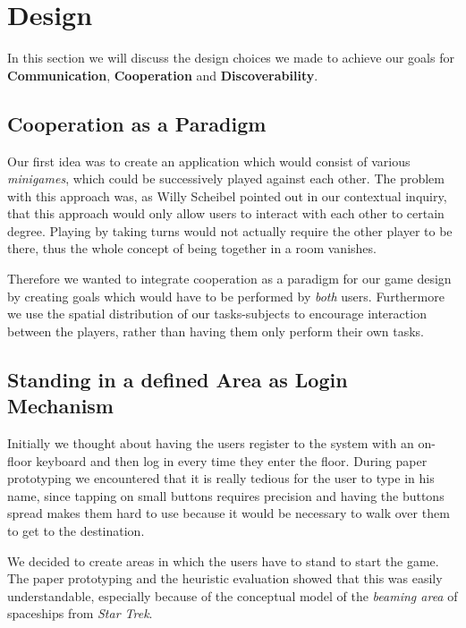 \documentclass{sigchi}
\begin{document}
\section{Design}
\vspace{1mm}
In this section we will discuss the design choices we made to achieve our goals for \textbf{Communication}, \textbf{Cooperation} and \textbf{Discoverability}.

\subsection{Cooperation as a Paradigm}
\vspace{1mm}
Our first idea was to create an application which would consist of various \textit{minigames}, which could be successively played against each other. The problem with this approach was, as Willy Scheibel pointed out in our contextual inquiry, that this approach would only allow users to interact with each other to certain degree. Playing by taking turns would not actually require the other player to be there, thus the whole concept of being together in a room vanishes. 

Therefore we wanted to integrate cooperation as a paradigm for our game design by creating goals which would have to be performed by \textit{both} users. Furthermore we use the spatial distribution of our tasks-subjects to encourage interaction between the players, rather than having them only perform their own tasks. 
 
\subsection{Standing in a defined Area as Login Mechanism}
\vspace{1mm}
Initially we thought about having the users register to the system with an on-floor keyboard and then log in every time they enter the floor. During paper prototyping we encountered that it is really tedious for the user to type in his name, since tapping on small buttons requires precision and having the buttons spread makes them hard to use because it would be necessary to walk over them to get to the destination. 

We decided to create areas in which the users have to stand to start the game. The paper prototyping and the heuristic evaluation showed that this was easily understandable, especially because of the conceptual model of the \textit{beaming area} of spaceships from \textit{Star Trek}. 
\end{document}
